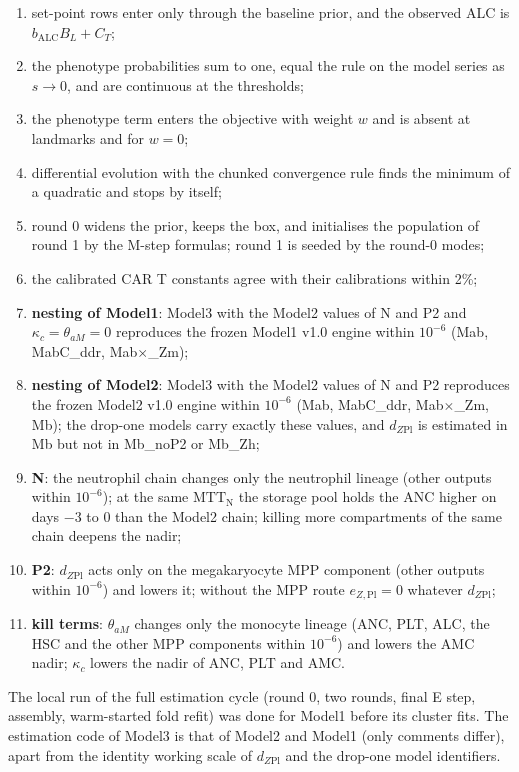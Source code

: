 \documentclass[11pt]{article}
\begin{document}
\begin{enumerate}
\item set-point rows enter only through the baseline prior, and the observed ALC is $b_{\mathrm{ALC}}B_L+C_T$;
\item the phenotype probabilities sum to one, equal the rule on the model series as $s\to0$, and are continuous at the thresholds;
\item the phenotype term enters the objective with weight $w$ and is absent at landmarks and for $w=0$;
\item differential evolution with the chunked convergence rule finds the minimum of a quadratic and stops by itself;
\item round 0 widens the prior, keeps the box, and initialises the population of round 1 by the M-step formulas; round 1 is seeded by the round-0 modes;
\item the calibrated CAR T constants agree with their calibrations within 2\%;
\item \textbf{nesting of Model1}: Model3 with the Model2 values of N and P2 and $\kappa_c=\theta_{aM}=0$ reproduces the frozen Model1 v1.0 engine within $10^{-6}$ (Mab, MabC\_ddr, Mab$\times$\_Zm);
\item \textbf{nesting of Model2}: Model3 with the Model2 values of N and P2 reproduces the frozen Model2 v1.0 engine within $10^{-6}$ (Mab, MabC\_ddr, Mab$\times$\_Zm, Mb); the drop-one models carry exactly these values, and $d_{Z\mathrm{Pl}}$ is estimated in Mb but not in Mb\_noP2 or Mb\_Zh;
\item \textbf{N}: the neutrophil chain changes only the neutrophil lineage (other outputs within $10^{-6}$); at the same $\mathrm{MTT}_{\mathrm{N}}$ the storage pool holds the ANC higher on days $-3$ to 0 than the Model2 chain; killing more compartments of the same chain deepens the nadir;
\item \textbf{P2}: $d_{Z\mathrm{Pl}}$ acts only on the megakaryocyte MPP component (other outputs within $10^{-6}$) and lowers it; without the MPP route $e_{Z,\mathrm{Pl}}=0$ whatever $d_{Z\mathrm{Pl}}$;
\item \textbf{kill terms}: $\theta_{aM}$ changes only the monocyte lineage (ANC, PLT, ALC, the HSC and the other MPP components within $10^{-6}$) and lowers the AMC nadir; $\kappa_c$ lowers the nadir of ANC, PLT and AMC.
\end{enumerate}
The local run of the full estimation cycle (round 0, two rounds, final E step, assembly, warm-started fold refit) was done for Model1 before its cluster fits. The estimation code of Model3 is that of Model2 and Model1 (only comments differ), apart from the identity working scale of $d_{Z\mathrm{Pl}}$ and the drop-one model identifiers.
\end{document}

